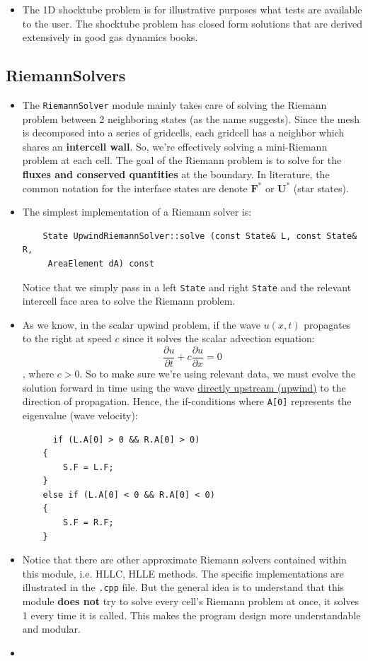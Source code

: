 \documentclass{article}
\begin{document}
\begin{itemize}
	\item The 1D shocktube problem is for illustrative purposes what tests are available to the user. The shocktube problem has closed form solutions that are derived extensively in good gas dynamics books. 
\end{itemize}

\subsection{RiemannSolvers}
\begin{itemize}
	\item The \texttt{RiemannSolver} module mainly takes care of solving the Riemann problem between 2 neighboring states (as the name suggests). Since the mesh is decomposed into a series of gridcells, each gridcell has a neighbor which shares an \textbf{intercell wall}. So, we're effectively solving a mini-Riemann problem at each cell. The goal of the Riemann problem is to solve for the \textbf{fluxes and conserved quantities} at the boundary. In literature, the common notation for the interface states are denote $\mathbf{F^*}$ or $\mathbf{U^*}$ (star states).
	
	\item  The simplest implementation of a Riemann solver is: \begin{verbatim}
	State UpwindRiemannSolver::solve (const State& L, const State& R,
	 AreaElement dA) const
	\end{verbatim}
Notice that we simply pass in a left \texttt{State} and right \texttt{State} and the relevant intercell face area to solve the Riemann problem. 
	
	\item As we know, in the scalar upwind problem, if the wave $u(x,t)$ propagates to the right at speed $c$ since it solves the scalar advection equation:
	$$\frac{\partial u}{\partial t}+c\frac{\partial u}{\partial x} = 0$$, where $c > 0$. So to make sure we're using relevant data, we must evolve the solution forward in time using the wave \underline{directly upstream (upwind)} to the direction of propagation. Hence, the if-conditions where \texttt{A[0]} represents the eigenvalue (wave velocity): 
	\begin{verbatim}
	  if (L.A[0] > 0 && R.A[0] > 0)
    {
        S.F = L.F;
    }
    else if (L.A[0] < 0 && R.A[0] < 0)
    {
        S.F = R.F;
    }	
	\end{verbatim}		

	\item Notice that there are other approximate Riemann solvers contained within this module, i.e. HLLC, HLLE methods. The specific implementations are illustrated in the \texttt{.cpp} file. But the general idea is to understand that this module \textbf{does not} try to solve every cell's Riemann problem at once, it solves 1 every time it is called. This makes the program design more understandable and modular.
	
	\item  
\end{itemize} 
\end{document}
